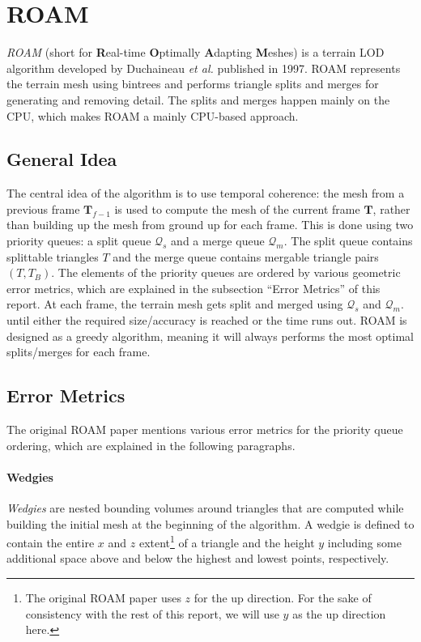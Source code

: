 \section{ROAM}
\textit{ROAM} (short for \textbf{R}eal-time \textbf{O}ptimally \textbf{A}dapting \textbf{M}eshes) 
is a terrain LOD algorithm developed by Duchaineau \textit{et al.} \cite{roam} published in 1997.
ROAM represents the terrain mesh using bintrees and performs triangle splits and merges
for generating and removing detail. 
The splits and merges happen mainly on the CPU, which makes ROAM a mainly CPU-based approach.

\subsection{General Idea}
The central idea of the algorithm is to use temporal coherence: the mesh from a previous frame $\mathbf{T}_{f-1}$ is used to compute 
the mesh of the current frame $\mathbf{T}$, rather than building up the mesh from ground up for each frame.
This is done using two priority queues: a split queue $\mathcal{Q}_s$ and a merge queue $\mathcal{Q}_m$.
The split queue contains splittable triangles $T$
and the merge queue contains mergable triangle pairs $(T,T_B)$.
The elements of the priority queues are ordered by 
various geometric error metrics, which are explained in the subsection ``Error Metrics'' of this report.
At each frame, the terrain mesh gets split and merged using $\mathcal{Q}_s$ and $\mathcal{Q}_m$. until either the required size/accuracy is reached
or the time runs out.
ROAM is designed as a greedy algorithm, meaning it will always performs the most optimal splits/merges for each frame.

\subsection{Error Metrics}
The original ROAM paper mentions various error metrics for the priority queue ordering,
which are explained in the following paragraphs.

\paragraph{Wedgies} \textit{Wedgies} are nested bounding volumes around triangles that are computed 
while building the initial mesh at the beginning of the algorithm.
A wedgie is defined to contain the entire $x$ and $z$ extent\footnote{The original ROAM paper uses $z$ for the up direction. For the sake of consistency with the rest of this report, we will use $y$ as the up direction here.}
of a triangle and the height $y$ including some additional space above and below the highest and lowest points,
respectively.

